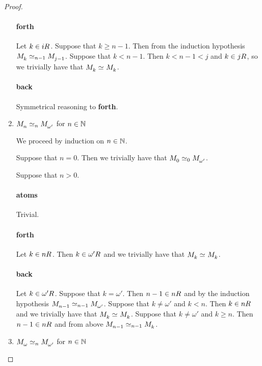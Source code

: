 \begin{proof}
\begin{enumerate}
        \paragraph{forth} Let $k \in \kSuccessors{}{i}$.
        Suppose that $k \geq n - 1$. Then from the induction hypothesis $\kPModel{k} \bisimilar [n-1] \kPModel{j - 1}$.
        Suppose that $k < n - 1$. Then $k < n - 1 < j$ and $k \in \kSuccessors{}{j}$, so we trivially have that $\kPModel{k} \bisimilar \kPModel{k}$.

        \paragraph{back} Symmetrical reasoning to {\bf forth}.

    \item $\kPModel{n} \bisimilar[n] \kPModel{\omega'}$ for $n \in \mathbb{N}$

        We proceed by induction on $n \in \mathbb{N}$.

        Suppose that $n = 0$. Then we trivially have that $\kPModel{0} \bisimilar[0] \kPModel{\omega'}$.

        Suppose that $n > 0$.

        \paragraph{atoms} Trivial.

        \paragraph{forth} Let $k \in \kSuccessors{}{n}$. Then $k \in \kSuccessors{}{\omega'}$ and we trivially have that $\kPModel{k} \bisimilar \kPModel{k}$.

        \paragraph{back} Let $k \in \kSuccessors{}{\omega'}$. 
        Suppose that $k = \omega'$. Then $n - 1 \in \kSuccessors{}{n}$ and by the induction hypothesis $\kPModel{n - 1} \bisimilar[n - 1] \kPModel{\omega'}$. 
        Suppose that $k \neq \omega'$ and $k < n$. Then $k \in \kSuccessors{}{n}$ and we trivially have that $\kPModel{k} \bisimilar \kPModel{k}$.
        Suppose that $k \neq \omega'$ and $k \geq n$. Then $n - 1 \in \kSuccessors{}{n}$ and from above $\kPModel{n - 1} \bisimilar[n - 1] \kPModel{k}$.

    \item $\kPModel{\omega} \bisimilar[n] \kPModel{\omega'}$ for $n \in \mathbb{N}$


\end{enumerate}
\end{proof}
